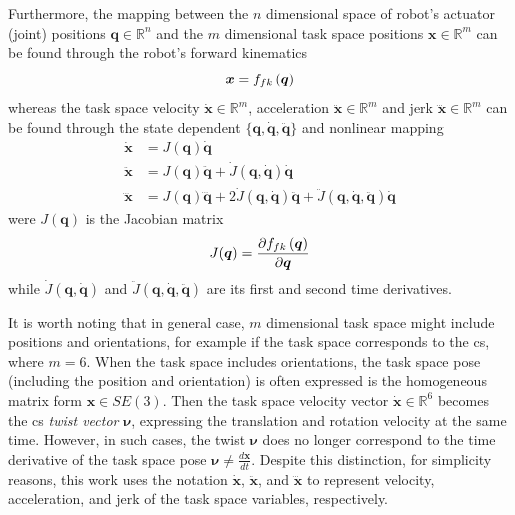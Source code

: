 Furthermore, the mapping between the $n$ dimensional space of robot's actuator (joint) positions $\bm{q}\in \mathbb{R}^n$ and the $m$ dimensional task space positions $\bm{x} \in \mathbb{R}^m$ can be found through the robot's forward kinematics 
\begin{equation}
    \bm{x} = f_{fk}\left(\bm{q}\right)
\end{equation}
whereas the task space velocity $\dot{\bm{x}}\in \mathbb{R}^m$, acceleration $\ddot{\bm{x}}\in \mathbb{R}^m$ and jerk $\dddot{\bm{x}}\in \mathbb{R}^m$ can be found through the state dependent  $\{\bm{q},\dot{\bm{q}},\ddot{\bm{q}}\}$  and nonlinear mapping
\begin{subequations}
\begin{align}
\dot{\bm{x}}&= {J}(\bm{q})\dot{\bm{q}} \label{eq:js_to_cs_vaj:vel}\\
\ddot{\bm{x}}&= J(\bm{q})\ddot{\bm{q}} + \dot{J}(\bm{q},\dot{\bm{q}})\dot{\bm{q}} \label{eq:js_to_cs_vaj:accel}\\
\dddot{\bm{x}}&= J(\bm{q})\dddot{\bm{q}} + 2\dot{J}(\bm{q},\dot{\bm{q}})\ddot{\bm{q}} + \ddot{J}(\bm{q},\dot{\bm{q}},\ddot{\bm{q}})\dot{\bm{q}}\label{eq:js_to_cs_vaj:jerk}
 \end{align} \label{eq:js_to_cs_vaj}
\end{subequations}
were $J(\bm{q}) $ is the Jacobian matrix
\begin{equation}
    J(\bm{q}) = \frac{\partial f_{fk}\left(\bm{q}\right)}{\partial \bm{q}}
\end{equation}
while $\dot{J}(\bm{q},\dot{\bm{q}})$ and $\ddot{J}(\bm{q},\dot{\bm{q}},\ddot{\bm{q}})$ are its first and second time derivatives.


It is worth noting that in general case, $m$ dimensional task space might include positions and orientations, for example if the task space corresponds to the \gls{cs}, where $m=6$. When the task space includes orientations, the task space pose (including the position and orientation) is often expressed is the homogeneous matrix form $\bm{x}\in SE(3)$. Then the task space velocity vector $\dot{\bm{x}}\in\mathbb{R}^6$ becomes the \gls{cs} \textit{twist vector} $\bm{\nu}$, expressing the translation and rotation velocity at the same time. However, in such cases, the twist $\bm{\nu}$ does no longer correspond to the time derivative of the task space pose $\bm{\nu}\neq\frac{d\bm{x}}{dt}$. Despite this distinction, for simplicity reasons, this work uses the notation $\dot{\bm{x}}$, $\ddot{\bm{x}}$, and $\dddot{\bm{x}}$ to represent velocity, acceleration, and jerk of the task space variables, respectively.


